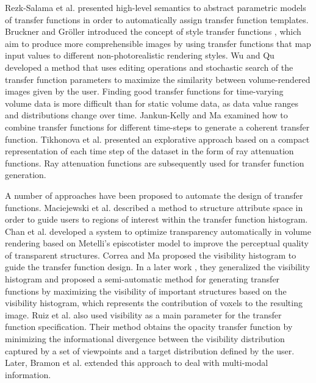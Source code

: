 Rezk-Salama et al. \cite{rezk-salama_automatic_2000} presented high-level semantics to abstract parametric models of transfer functions in order to automatically assign transfer function templates.
Bruckner and Gr{\"o}ller introduced the concept of style transfer functions \cite{bruckner_style_2007}, which aim to produce more comprehensible images by using transfer functions that map input values to different non-photorealistic rendering styles.
Wu and Qu \cite{wu_interactive_2007} developed a method that uses editing operations and stochastic search of the transfer function parameters to maximize the similarity between volume-rendered images given by the user.
Finding good transfer functions for time-varying volume data is more difficult than for static volume data, as data value ranges and distributions change over time.
Jankun-Kelly and Ma \cite{jankun-kelly_study_2001} examined how to combine transfer functions for different time-steps to generate a coherent transfer function.
Tikhonova et al. \cite{tikhonova_exploratory_2010} presented an explorative approach based on a compact representation of each time step of the dataset in the form of ray attenuation functions. Ray attenuation functions are subsequently used for transfer function generation.

A number of approaches have been proposed to automate the design of transfer functions.
Maciejewski et al. \cite{maciejewski_structuring_2009} described a method to structure attribute space in order to guide users to regions of interest within the transfer function histogram.
Chan et al. \cite{chan_perception-based_2009} developed a system to optimize transparency automatically in volume rendering based on Metelli's episcotister model to improve the perceptual quality of transparent structures.
Correa and Ma \cite{correa_visibility-driven_2009} proposed the visibility histogram to guide the transfer function design. In a later work \cite{correa_visibility_2011}, they generalized the visibility histogram and proposed a semi-automatic method for generating transfer functions by maximizing the visibility of important structures based on the visibility histogram, which represents the contribution of voxels to the resulting image.
Ruiz et al. \cite{ruiz_automatic_2011} also used visibility as a main parameter for the transfer function specification. Their method obtains the opacity transfer function by minimizing the informational divergence between the visibility distribution captured by a set of viewpoints and a target distribution defined by the user. Later, Bramon et al. \cite{bramon_information_2013} extended this approach to deal with multi-modal information.

